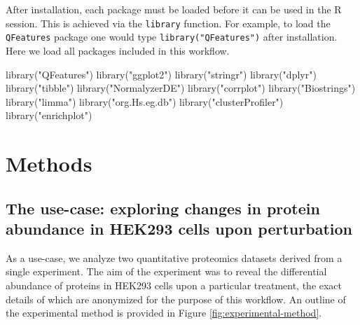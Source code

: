 \documentclass[9pt,a4paper,]{extarticle}
\newenvironment{Shaded}{\begin{snugshade}}{\end{snugshade}}
\newcommand{\FunctionTok}[1]{\textcolor[rgb]{0.00,0.00,0.00}{#1}}
\newcommand{\NormalTok}[1]{#1}
\newcommand{\StringTok}[1]{\textcolor[rgb]{0.31,0.60,0.02}{#1}}
\begin{document}
After installation, each package must be loaded before it can be used in the R
session. This is achieved via the \texttt{library} function. For example, to load the
\texttt{QFeatures} package one would type \texttt{library("QFeatures")} after installation.
Here we load all packages included in this workflow.

\begin{Shaded}
\begin{Highlighting}[]
\FunctionTok{library}\NormalTok{(}\StringTok{"QFeatures"}\NormalTok{)}
\FunctionTok{library}\NormalTok{(}\StringTok{"ggplot2"}\NormalTok{)}
\FunctionTok{library}\NormalTok{(}\StringTok{"stringr"}\NormalTok{)}
\FunctionTok{library}\NormalTok{(}\StringTok{"dplyr"}\NormalTok{)}
\FunctionTok{library}\NormalTok{(}\StringTok{"tibble"}\NormalTok{)}
\FunctionTok{library}\NormalTok{(}\StringTok{"NormalyzerDE"}\NormalTok{)}
\FunctionTok{library}\NormalTok{(}\StringTok{"corrplot"}\NormalTok{)}
\FunctionTok{library}\NormalTok{(}\StringTok{"Biostrings"}\NormalTok{)}
\FunctionTok{library}\NormalTok{(}\StringTok{"limma"}\NormalTok{)}
\FunctionTok{library}\NormalTok{(}\StringTok{"org.Hs.eg.db"}\NormalTok{)}
\FunctionTok{library}\NormalTok{(}\StringTok{"clusterProfiler"}\NormalTok{)}
\FunctionTok{library}\NormalTok{(}\StringTok{"enrichplot"}\NormalTok{)}
\end{Highlighting}
\end{Shaded}

\hypertarget{methods}{%
\section{Methods}\label{methods}}

\hypertarget{the-use-case-exploring-changes-in-protein-abundance-in-hek293-cells-upon-perturbation}{%
\subsection{The use-case: exploring changes in protein abundance in HEK293 cells upon perturbation}\label{the-use-case-exploring-changes-in-protein-abundance-in-hek293-cells-upon-perturbation}}

As a use-case, we analyze two quantitative proteomics datasets derived from a
single experiment. The aim of the experiment was to reveal the differential
abundance of proteins in HEK293 cells upon a particular treatment, the exact
details of which are anonymized for the purpose of this workflow. An outline of
the experimental method is provided in Figure \ref{fig:experimental-method}.
\end{document}
